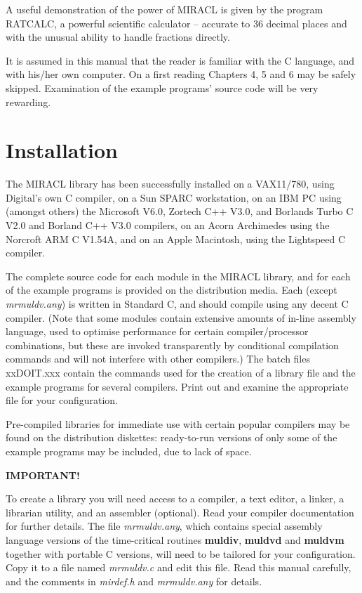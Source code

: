 A  useful  demonstration  of  the power of MIRACL is given by the program 
RATCALC, a powerful scientific calculator -- accurate to 36 decimal places 
and with the unusual ability to handle fractions directly.  

\vspace{5mm}
It is assumed in this manual that the reader is familiar with the C language, 
and with his/her own computer. On a first reading Chapters 4, 5 and 6 may be 
safely skipped. Examination of the example programs' source code will be very 
rewarding.



\cleardoublepage 
\chapter{Installation}

The MIRACL library has been successfully installed on a VAX11/780, 
using Digital's own C compiler, on a Sun SPARC workstation, on an IBM PC 
using (amongst  others) 
the Microsoft V6.0, Zortech C++ V3.0, 
and Borlands Turbo C V2.0 and Borland C++ V3.0 compilers, on an Acorn 
Archimedes using the 
Norcroft ARM  C V1.54A, and on an Apple Macintosh, using the Lightspeed C 
compiler. 

The complete source code for each module in the MIRACL library, and  for each  
of the example programs is provided on the distribution media.  Each (except 
{\em mrmuldv.any}) is written in Standard C, and should compile using any 
decent C compiler. (Note that some modules contain extensive amounts of 
in-line assembly language, used to optimise performance for certain 
compiler/processor combinations, but these are invoked transparently by 
conditional compilation commands and will not interfere with other compilers.) 
The batch files xxDOIT.xxx contain the commands used for the creation  of a 
library file and the example programs for several compilers.   Print  out  and  
examine  the  appropriate  file  for  your configuration. 

Pre-compiled libraries for immediate use with certain  popular  compilers
may be found on the distribution diskettes: ready-to-run versions of  only  some
of the example programs may be included, due to  lack  of  space.

\vspace{3mm}
{\bf IMPORTANT!}
\vspace{3mm}

To  create  a  library  you will need access to a compiler, a text editor,
a linker, a 
librarian utility,  and  an  assembler  (optional).  Read  your  compiler 
documentation  for further details.  The file {\em mrmuldv.any}, which contains
special assembly language versions of the time-critical routines {\bf muldiv}, 
{\bf muldvd} and {\bf muldvm}  
together with portable C versions, will need  to  be 
tailored for your configuration.  Copy it to a file named  {\em mrmuldv.c}  and 
edit this file. Read this manual carefully, and the comments in 
{\em mirdef.h} and {\em mrmuldv.any} for details.  


